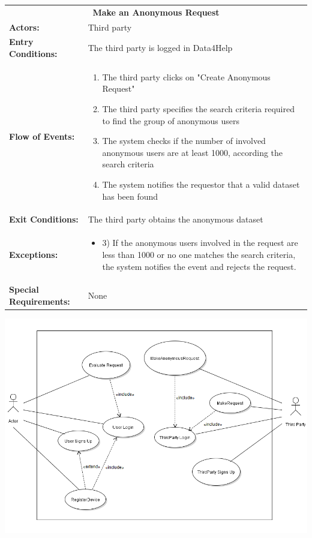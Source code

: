 \begin{table}[H]
	\centering
	{\renewcommand{\arraystretch}{1.5}%
		\begin{tabular}{|@{\hspace{2em}} p{4cm} @{}| p{11cm} @{\qquad}|}
			\cline{1-2}
			\multicolumn{2}{|c|}{\textbf{Make an Anonymous Request}} \\ \cline{1-2}
			\textbf{Actors:} & Third party \\ \cline{1-2}
			\textbf{Entry Conditions:} & The third party is logged in Data4Help \\ \cline{1-2}
			\textbf{Flow of Events:} & 
			\begin{enumerate}[itemsep=-0.2em, topsep=0em]
				\item The third party clicks on "Create Anonymous Request"
				\item The third party specifies the search criteria required to find the group of anonymous users
				\item The system checks if the number of involved anonymous users are at least 1000, according the search criteria
				\item The system notifies the requestor that a valid dataset has been found
			\end{enumerate}\\ \cline{1-2}
			\textbf{Exit Conditions:} & The third party obtains the anonymous dataset \\ \cline{1-2}
			\textbf{Exceptions:} & 
			\begin{itemize} [itemsep=-0.2em, topsep=0em]
				\item 3) If the anonymous users involved in the request are less than 1000 or no one matches the search criteria, the system notifies the event and rejects the request.
			\end{itemize} \\ \cline{1-2}
			\textbf{Special Requirements:} & None \\ \hline
	\end{tabular}} \quad
\end{table}


\begin{center}
	\includegraphics[scale=1.1]{Images/UML/D4H_usecase.png}
\end{center}

